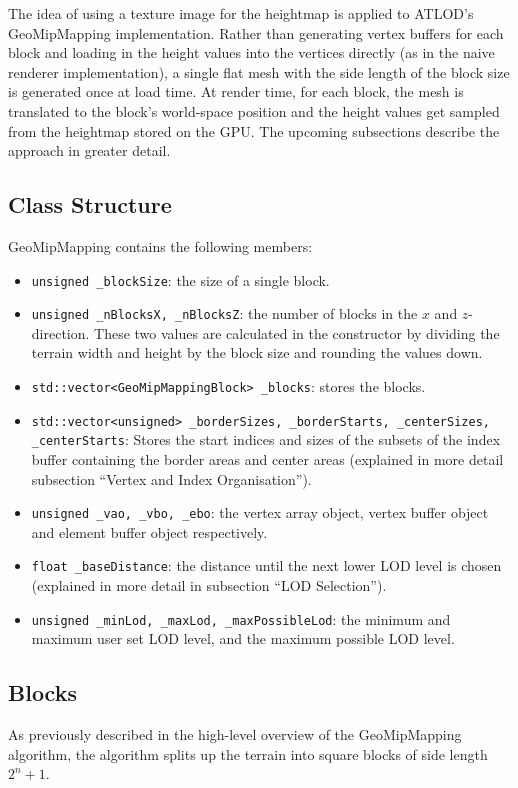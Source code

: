 The idea of using a texture image for the heightmap is applied to ATLOD's GeoMipMapping implementation.
Rather than generating vertex buffers for each block and loading in the height values into the vertices directly (as in the naive renderer implementation),
a single flat mesh with the side length of the block size is generated once at load time. At render time, for each block, the mesh is translated 
to the block's world-space position and the height values get sampled from the heightmap stored on the GPU.
The upcoming subsections describe the approach in greater detail.

\subsection{Class Structure}
GeoMipMapping contains the following members:
\begin{itemize}
  \item \texttt{unsigned \_blockSize}: the size of a single block.
  \item \texttt{unsigned \_nBlocksX, \_nBlocksZ}: the number of blocks in the $x$ and $z$-direction. 
        These two values are calculated in the constructor by dividing the terrain width and height by the block size and rounding the values down.
  \item \texttt{std::vector<GeoMipMappingBlock> \_blocks}: stores the blocks.
  \item \texttt{std::vector<unsigned> \_borderSizes, \_borderStarts, \_centerSizes, \_centerStarts}:
        Stores the start indices and sizes of the subsets of the index buffer containing the border areas and center areas (explained in more detail subsection ``Vertex and Index Organisation'').
  \item \texttt{unsigned \_vao, \_vbo, \_ebo}: the vertex array object, vertex buffer object and element buffer object respectively.
  \item \texttt{float \_baseDistance}: the distance until the next lower LOD level is chosen (explained in more detail in subsection ``LOD Selection'').
  \item \texttt{unsigned \_minLod, \_maxLod, \_maxPossibleLod}: the minimum and maximum user set LOD level, and the maximum possible LOD level.
\end{itemize}

\subsection{Blocks}
As previously described in the high-level overview of the GeoMipMapping algorithm, 
the algorithm splits up the terrain into square blocks of side length $2^n+1$.

